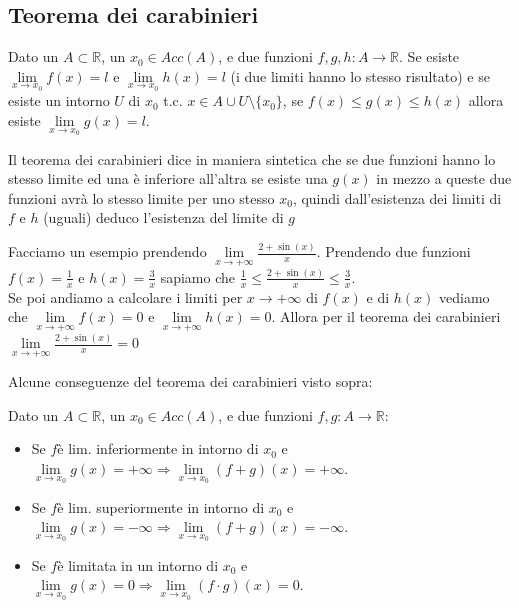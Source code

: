 \subsection{Teorema dei carabinieri}
\begin{theorem}
    Dato un $A \subset \mathbb{R}$, un $x_0 \in Acc(A)$, e due funzioni $f,g,h: A \to \mathbb{R}$. Se esiste $\lim\limits_{x\to x_0}f(x) = l$ e $\lim\limits_{x\to x_0}h(x) = l$ (i due limiti hanno lo stesso risultato) e se esiste un intorno $U$ di $x_0$ t.c. $x \in A \cup U \setminus \{x_0\}$, se $f(x) \leq g(x) \leq h(x)$ allora esiste $\lim\limits_{x\to x_0}g(x) = l$.
\end{theorem}
Il teorema dei carabinieri dice in maniera sintetica che se due funzioni hanno lo stesso limite ed una è inferiore all'altra se esiste una $g(x)$ in mezzo a queste due funzioni avrà lo stesso limite per uno stesso $x_0$, quindi dall'esistenza dei limiti di $f$ e $h$ (uguali) deduco l'esistenza del limite di $g$
\begin{example}
Facciamo un esempio prendendo $\lim\limits_{x\to +\infty}\frac{2 + \sin{(x)}}{x}$.
Prendendo due funzioni $f(x) = \frac{1}{x}$ e $h(x) = \frac{3}{x}$ sapiamo che $\frac{1}{x} \leq \frac{2 + \sin{(x)}}{x} \leq \frac{3}{x}$. \\
Se poi andiamo a calcolare i limiti per $x \to +\infty$ di $f(x)$ e di $h(x)$ vediamo che $\lim\limits_{x\to +\infty}f(x) = 0$ e $\lim\limits_{x\to +\infty}h(x) = 0$.
Allora per il teorema dei carabinieri $\lim\limits_{x\to +\infty}\frac{2 + \sin{(x)}}{x} = 0$
\end{example}

Alcune conseguenze del teorema dei carabinieri visto sopra:
\begin{proposition}
Dato un $A \subset \mathbb{R}$, un $x_0 \in Acc(A)$, e due funzioni $f,g: A \to \mathbb{R}$:
\begin{itemize}
    \item Se $f$è lim. inferiormente in intorno di $x_0$ e $\lim\limits_{x\to x_0}g(x) = +\infty \Longrightarrow \lim\limits_{x\to x_0}(f + g)(x) = +\infty$.
    \item Se $f$è lim. superiormente in intorno di $x_0$ e $\lim\limits_{x\to x_0}g(x) = -\infty \Longrightarrow \lim\limits_{x\to x_0}(f + g)(x) = -\infty$.
    \item Se $f$è limitata in un intorno di $x_0$ e $\lim\limits_{x\to x_0}g(x) = 0 \Longrightarrow \lim\limits_{x\to x_0}(f \cdot g)(x) = 0$.
\end{itemize}
\end{proposition}

